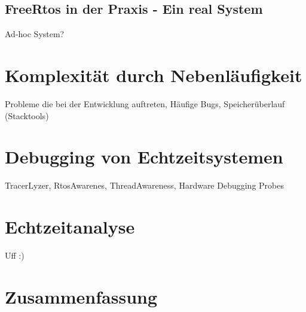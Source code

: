 \documentclass[ngerman]{seminarvorlage}
\begin{document}
\subsection{FreeRtos in der Praxis - Ein real System}
Ad-hoc System? 
\section{Komplexität durch Nebenläufigkeit}
Probleme die bei der Entwicklung auftreten, Häufige Bugs, Speicherüberlauf (Stacktools)
\section{Debugging von Echtzeitsystemen}
TracerLyzer, RtosAwarenes, ThreadAwareness, Hardware Debugging Probes 
\label{sec:Debugging von Echtzeitsystemen}
\section{Echtzeitanalyse}
Uff :)
\label{sec:Echtzeitanalyse} 

 
\section{Zusammenfassung}
\pagebreak

\end{document}
